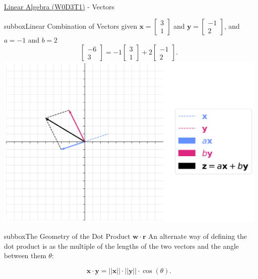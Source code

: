 \begin{textbox}{\href{https://compneuro.neuromatch.io/tutorials/W0D3_LinearAlgebra/student/W0D3_Tutorial1.html}{Linear Algebra (W0D3T1)} - Vectors}
\begin{subbox}{subbox}{Linear Combination of Vectors}
given $\mathbf{x} = \begin{bmatrix}3 \\ 1 \end{bmatrix}$ and $\mathbf{y} = \begin{bmatrix}-1 \\ 2 \end{bmatrix}$, and $a=-1$ and $b=2$
\begin{equation*}
\begin{bmatrix}-6 \\ 3 \end{bmatrix}= -1\begin{bmatrix}3 \\ 1 \end{bmatrix} +2 \begin{bmatrix}-1 \\ 2 \end{bmatrix}.
\end{equation*}
\centering
\includegraphics[scale=0.15]{Figures/PreCourse/Figure3.png}
\end{subbox}
\begin{subbox}{subbox}{The Geometry of the Dot Product $\mathbf{w}\cdot\mathbf{r}$}
\scriptsize
An alternate way of defining the dot product is as the multiple of the lengths of the two vectors and the angle between them $\theta$:

\begin{equation}
\mathbf{x} \cdot \mathbf{y} = ||\mathbf{x}|| \cdot ||\mathbf{y}|| \cdot \cos(\theta).
\end{equation}

\end{subbox}
\end{textbox}
